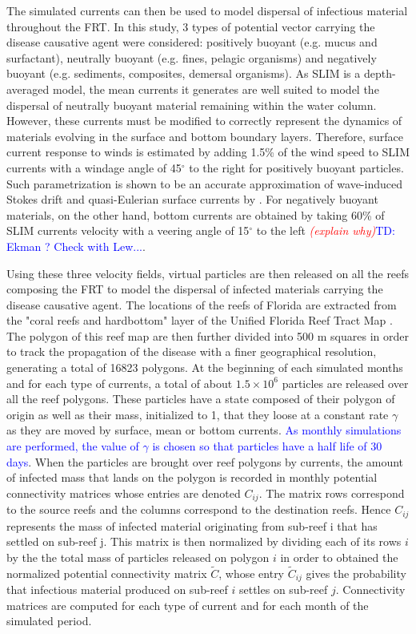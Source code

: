 \documentclass[utf8]{frontiersSCNS}
\newcommand{\emphc}[1]{\emph{\textcolor{red}{#1}}}
\begin{document}
The simulated currents can then be used to model dispersal of infectious material throughout the FRT. In this study, 3 types of potential vector carrying the disease causative agent were considered: positively buoyant (e.g. mucus and surfactant), neutrally buoyant (e.g. fines, pelagic organisms) and negatively buoyant (e.g. sediments, composites, demersal organisms). As SLIM is a depth-averaged model, the mean currents it generates are well suited to model the dispersal of neutrally buoyant material remaining within the water column. However, these currents must be modified to correctly represent the dynamics of materials evolving in the surface and bottom boundary layers. Therefore, surface current response to winds is estimated by adding 1.5\% of the wind speed to SLIM currents with a windage angle of 45$^\circ$ to the right for positively buoyant particles. Such parametrization is shown to be an accurate approximation of wave-induced Stokes drift and quasi-Eulerian surface currents by \citep{ardhuin2009observation}. For negatively buoyant materials, on the other hand, bottom currents are obtained by taking 60\% of SLIM currents velocity with a veering angle of 15$^\circ$ to the left \emphc{(explain why)}\textcolor{blue}{TD: Ekman ? Check with Lew...}.

Using these three velocity fields, virtual particles are then released on all the reefs composing the FRT to model the dispersal of infected materials carrying the disease causative agent. The locations of the reefs of Florida are extracted from the "coral reefs and hardbottom" layer of the Unified Florida Reef Tract Map \citep{fwc2017unified}. The polygon of this reef map are then further divided into 500 m squares in order to track the propagation of the disease with a finer geographical resolution, generating a total of 16823 polygons. %
At the beginning of each simulated months and for each type of currents, a total of about $1.5 \times 10^6$ particles are released over all the reef polygons. These particles have a state composed of their polygon of origin as well as their mass, initialized to 1, that they loose at a constant rate $\gamma$ as they are moved by surface, mean or bottom currents. \textcolor{blue}{As monthly simulations are performed, the value of $\gamma$ is chosen so that particles have a half life of 30 days}. When the particles are brought over reef polygons by currents, the amount of infected mass that lands on the polygon is recorded in monthly potential connectivity matrices whose entries are denoted $C_{ij}$. The matrix rows correspond to the source reefs and the columns correspond to the destination reefs. Hence $C_{ij}$ represents the mass of infected material originating from sub-reef i that has settled on sub-reef j. This matrix is then normalized by dividing each of its rows $i$ by the the total mass of particles released on polygon $i$ in order to obtained the normalized potential connectivity matrix $\tilde{C}$, whose entry $\tilde{C}_{ij}$ gives the probability that infectious material produced on sub-reef $i$ settles on sub-reef $j$. Connectivity matrices are computed for each type of current and for each month of the simulated period.
\end{document}

